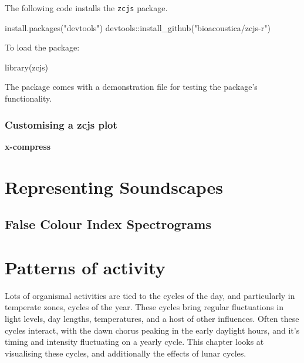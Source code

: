 \documentclass[
]{book}
\newenvironment{Shaded}{\begin{snugshade}}{\end{snugshade}}
\newcommand{\FunctionTok}[1]{\textcolor[rgb]{0.00,0.00,0.00}{#1}}
\newcommand{\NormalTok}[1]{#1}
\newcommand{\SpecialCharTok}[1]{\textcolor[rgb]{0.00,0.00,0.00}{#1}}
\newcommand{\StringTok}[1]{\textcolor[rgb]{0.31,0.60,0.02}{#1}}
\begin{document}
The following code installs the \texttt{zcjs} package.

\begin{Shaded}
\begin{Highlighting}[]
\FunctionTok{install.packages}\NormalTok{(}\StringTok{"devtools"}\NormalTok{)}
\NormalTok{devtools}\SpecialCharTok{::}\FunctionTok{install\_github}\NormalTok{(}\StringTok{"bioacoustica/zcjs{-}r"}\NormalTok{)}
\end{Highlighting}
\end{Shaded}

To load the package:

\begin{Shaded}
\begin{Highlighting}[]
\FunctionTok{library}\NormalTok{(zcjs)}
\end{Highlighting}
\end{Shaded}

The package comes with a demonstration file for testing the package's functionality.

\hypertarget{customising-a-zcjs-plot}{%
\subsection{Customising a zcjs plot}\label{customising-a-zcjs-plot}}

\textbf{x-compress}

\hypertarget{representing-soundscapes}{%
\chapter{Representing Soundscapes}\label{representing-soundscapes}}

\hypertarget{false-colour-index-spectrograms}{%
\section{False Colour Index Spectrograms}\label{false-colour-index-spectrograms}}

\hypertarget{patterns-of-activity}{%
\chapter{Patterns of activity}\label{patterns-of-activity}}

Lots of organismal activities are tied to the cycles of the day, and particularly in temperate zones, cycles of the year. These cycles bring regular fluctuations in light levels, day lengths, temperatures, and a host of other influences. Often these cycles interact, with the dawn chorus peaking in the early daylight hours, and it's timing and intensity fluctuating on a yearly cycle. This chapter looks at visualising these cycles, and additionally the effects of lunar cycles.
\end{document}
